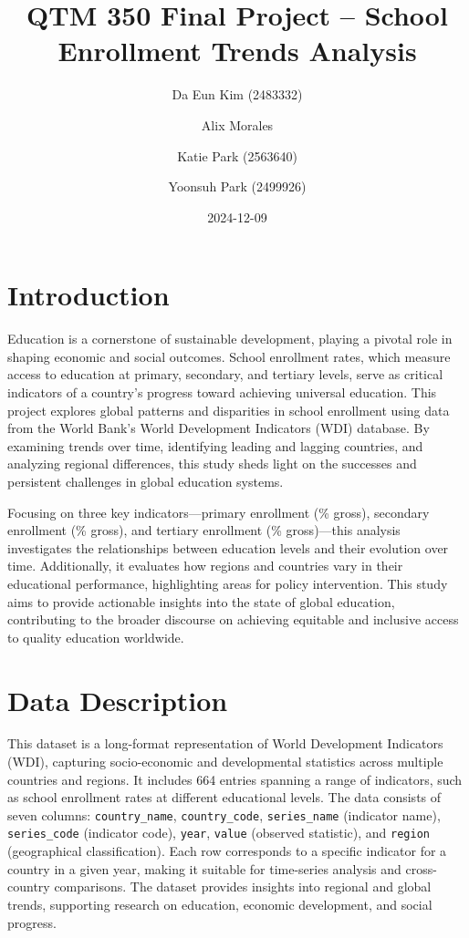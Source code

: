 \documentclass[
  letterpaper,
  DIV=11,
  numbers=noendperiod]{scrartcl}
\title{QTM 350 Final Project -- School Enrollment Trends Analysis}
\author{Da Eun Kim (2483332) \and Alix Morales \and Katie Park
(2563640) \and Yoonsuh Park (2499926)}
\date{2024-12-09}
\renewcommand*\contentsname{Table of contents}
\newcommand\contentsname{Table of contents}
\begin{document}
\maketitle

\renewcommand*\contentsname{Table of contents}
{
\hypersetup{linkcolor=}
\setcounter{tocdepth}{2}
\tableofcontents
}

\section{Introduction}\label{introduction}

Education is a cornerstone of sustainable development, playing a pivotal
role in shaping economic and social outcomes. School enrollment rates,
which measure access to education at primary, secondary, and tertiary
levels, serve as critical indicators of a country's progress toward
achieving universal education. This project explores global patterns and
disparities in school enrollment using data from the World Bank's World
Development Indicators (WDI) database. By examining trends over time,
identifying leading and lagging countries, and analyzing regional
differences, this study sheds light on the successes and persistent
challenges in global education systems.

Focusing on three key indicators---primary enrollment (\% gross),
secondary enrollment (\% gross), and tertiary enrollment (\%
gross)---this analysis investigates the relationships between education
levels and their evolution over time. Additionally, it evaluates how
regions and countries vary in their educational performance,
highlighting areas for policy intervention. This study aims to provide
actionable insights into the state of global education, contributing to
the broader discourse on achieving equitable and inclusive access to
quality education worldwide.

\section{Data Description}\label{data-description}

This dataset is a long-format representation of World Development
Indicators (WDI), capturing socio-economic and developmental statistics
across multiple countries and regions. It includes 664 entries spanning
a range of indicators, such as school enrollment rates at different
educational levels. The data consists of seven columns:
\texttt{country\_name}, \texttt{country\_code}, \texttt{series\_name}
(indicator name), \texttt{series\_code} (indicator code), \texttt{year},
\texttt{value} (observed statistic), and \texttt{region} (geographical
classification). Each row corresponds to a specific indicator for a
country in a given year, making it suitable for time-series analysis and
cross-country comparisons. The dataset provides insights into regional
and global trends, supporting research on education, economic
development, and social progress.
\end{document}
